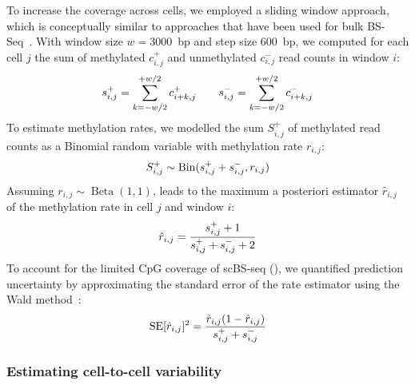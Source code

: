 To increase the coverage across cells, we employed a sliding window approach, which is conceptually similar to approaches that have been used for bulk BS-Seq~\citep{bock_dna_2012,li_dna_2010}. With window size $w=3000$~bp and step size 600~bp, we computed for each cell $j$ the sum of methylated $c^+_{i,j}$ and unmethylated $c^-_{i,j}$ read counts in window $i$:
\begin{align}
  s^+_{i,j} = \sum_{k=-w/2}^{+w/2} c^+_{i+k, j} \qquad
  s^-_{i,j} = \sum_{k=-w/2}^{+w/2} c^-_{i+k, j}
\end{align}
To estimate methylation rates, we modelled the sum $S^+_{i,j}$ of methylated read counts as a Binomial random variable with methylation rate $r_{i,j}$:
\begin{align}
  S^+_{i,j}\sim \operatorname{Bin}(s^+_{i,j}+s^-_{i,j}, r_{i,j})
\end{align}
Assuming $r_{i,j}\sim \operatorname{Beta}(1,1)$, leads to the maximum a posteriori estimator $\hat{r}_{i,j}$ of the methylation rate in cell $j$ and window $i$:
\begin{align}
  \hat{r}_{i,j} = \frac{s^+_{i,j}+1}{s^+_{i,j}+s^-_{i,j}+2}
\end{align}
To account for the limited CpG coverage of scBS-seq (), we quantified prediction uncertainty by approximating the standard error of the rate estimator using the Wald method~\citep{stein_sequential_1947}:
\begin{align}
  \operatorname{SE}[\hat{r}_{i,j}]^2 = \frac{\hat{r}_{i,j}(1-\hat{r}_{i,j})}{s^+_{i,j}+s^-_{i,j}}
\end{align}


\subsubsection{Estimating cell-to-cell variability}

